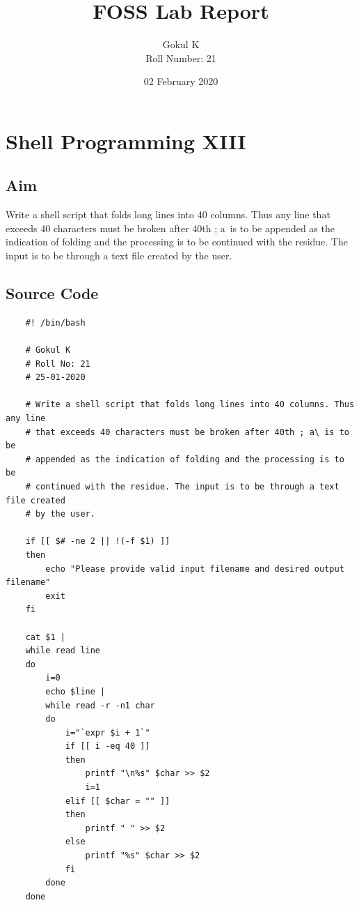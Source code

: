 \documentclass{article}
\begin{document}
\title{FOSS Lab Report}
\author{Gokul K\\[2\baselineskip]
Roll Number: 21\\[2\baselineskip]}
\date{02 February 2020}

\maketitle

\setcounter{section}{16}
\section{Shell Programming XIII}
\subsection{Aim}
Write a shell script that folds long lines into 40 columns. Thus any line
that exceeds 40 characters must be broken after 40th ; a\ is to be
appended as the indication of folding and the processing is to be
continued with the residue. The input is to be through a text file created
by the user.


\subsection{Source Code}
\begin{verbatim}
    #! /bin/bash

    # Gokul K
    # Roll No: 21
    # 25-01-2020

    # Write a shell script that folds long lines into 40 columns. Thus any line
    # that exceeds 40 characters must be broken after 40th ; a\ is to be
    # appended as the indication of folding and the processing is to be
    # continued with the residue. The input is to be through a text file created
    # by the user.

    if [[ $# -ne 2 || !(-f $1) ]]
    then
        echo "Please provide valid input filename and desired output filename"
        exit
    fi

    cat $1 |
    while read line
    do
        i=0
        echo $line |
        while read -r -n1 char
        do
            i="`expr $i + 1`"
            if [[ i -eq 40 ]]
            then
                printf "\n%s" $char >> $2
                i=1
            elif [[ $char = "" ]]
            then
                printf " " >> $2
            else
                printf "%s" $char >> $2
            fi
        done
    done

\end{verbatim}
\end{document}
